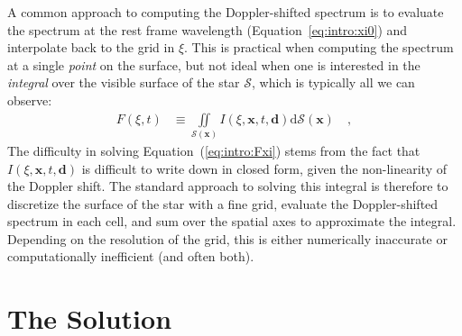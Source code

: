 \documentclass[modern]{aastex62}
\begin{document}
A common approach to computing the Doppler-shifted spectrum is to
evaluate the spectrum at the rest frame wavelength 
(Equation~\ref{eq:intro:xi0})
and interpolate back to the grid in $\xi$. This is practical when
computing the spectrum at a single \emph{point} on the surface, but not
ideal when one is interested in the \emph{integral} over the visible
surface of the star $\mathcal{S}$, which is typically all we can observe:
%
\begin{align}
    \label{eq:intro:Fxi}
    F(\xi, t) 
        &\equiv
        \iint\limits_{\mathcal{S}(\mathbf{x})}
                I(\xi, \mathbf{x}, t, \mathbf{d})
        \mathrm{d}{\mathcal{S}(\mathbf{x})}
        \quad ,
\end{align}
%
The difficulty in solving Equation~(\ref{eq:intro:Fxi}) stems from the fact
that $I(\xi, \mathbf{x}, t, \mathbf{d})$ is difficult to write down in 
closed form, given
the non-linearity of the Doppler shift.
The standard approach to solving this integral is therefore
to discretize the surface of the star with a fine grid, evaluate the
Doppler-shifted spectrum in each cell, and sum over the spatial axes
to approximate the integral. Depending on the resolution of the grid,
this is either numerically inaccurate or computationally inefficient 
(and often both).


\section{The Solution}
\end{document}

